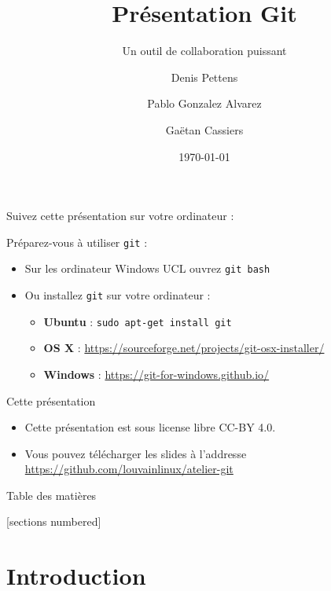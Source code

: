 \documentclass{beamer}
\title{Présentation Git}
\subtitle{Un outil de collaboration puissant}
\date{\today}
\author{Denis Pettens \and Pablo Gonzalez Alvarez \and Gaëtan Cassiers}
\institute{Louvain-li-Nux}
\begin{document}
\begin{frame}
\begin{center}
  Suivez cette présentation sur votre ordinateur :
   \vspace{1cm}
\end{center}

Préparez-vous à utiliser \texttt{git} :
\begin{itemize}
    \item Sur les ordinateur Windows UCL ouvrez \texttt{git bash}
    \item Ou installez \texttt{git} sur votre ordinateur :
    \begin{itemize}
        \item \textbf{Ubuntu} : \lstinline{sudo apt-get install git}
        \item \textbf{OS X} : \url{https://sourceforge.net/projects/git-osx-installer/}
        \item \textbf{Windows} : \url{https://git-for-windows.github.io/}
    \end{itemize}
\end{itemize}
\end{frame}

\maketitle

\begin{frame}{Cette présentation}
    \begin{itemize}
        \item Cette présentation est sous license libre CC-BY 4.0.
        \item Vous pouvez télécharger les slides à l'addresse
            \url{https://github.com/louvainlinux/atelier-git}
    \end{itemize}
\end{frame}

\begin{frame}{Table des matières}

[sections numbered]
\tableofcontents[hideallsubsections]

\end{frame}

\section{Introduction}
\end{document}
